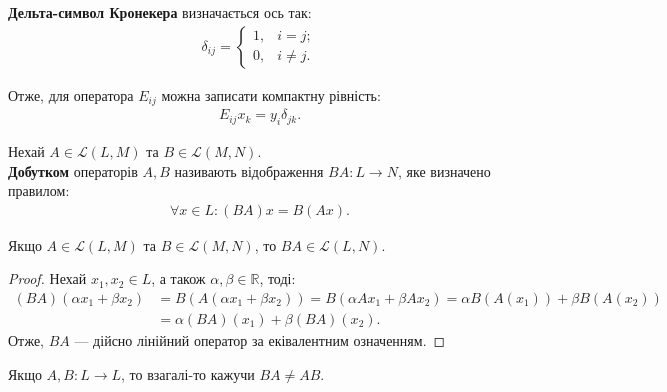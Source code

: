 \documentclass{math_library}
\begin{document}
	\begin{definition}
	\textbf{Дельта-символ Кронекера} визначається ось так:
\begin{align*}
\delta_{ij} = \begin{cases} 1, & i = j; \\ 0, & i \neq j. \end{cases} 
\end{align*}
	\end{definition}
	
	\begin{remark}
	Отже, для оператора $E_{ij}$ можна записати компактну рівність:
	\begin{align*}
	E_{ij}x_k = y_i \delta_{jk}.
	\end{align*}
	\end{remark}
	
	\begin{definition}
	Нехай $A \in \mathcal{L}(L,M)$ та $B \in \mathcal{L}(M,N)$.\\
	\textbf{Добутком} операторів $A,B$ називають відображення $BA \colon L \to N$, яке визначено правилом:
	\begin{align*}
	\forall x \in L: (BA)x = B(Ax).
	\end{align*}
	\end{definition}
	
	\begin{lemma}
	Якщо $A \in \mathcal{L}(L,M)$ та $B \in \mathcal{L}(M,N)$, то $BA \in \mathcal{L}(L,N)$.
	\end{lemma}
	
	\begin{proof}
	Нехай $x_1,x_2 \in L$, а також $\alpha,\beta \in \mathbb{R}$, тоді:
	\begin{align*}
	(BA)(\alpha x_1 + \beta x_2) & = B(A(\alpha x_1 + \beta x_2)) = B(\alpha Ax_1 + \beta Ax_2) = \alpha B(A(x_1)) + \beta B(A(x_2)) \\
	& = \alpha (BA)(x_1) + \beta (BA)(x_2).
	\end{align*}
	Отже, $BA$ --- дійсно лінійний оператор за еківалентним означенням.
	\end{proof}
	
	\begin{remark}
	Якщо $A,B \colon L \to L$, то взагалі-то кажучи $BA \neq AB$.
	\end{remark}
	
\end{document}
